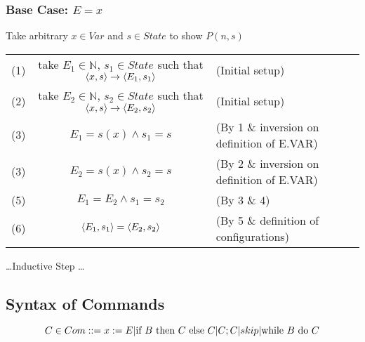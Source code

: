 \documentclass{report}
\begin{document}
\subsubsection*{Base Case: $E = x$}
Take arbitrary $x \in Var$ and $s \in State$ to show $P(n,s)$
\begin{center}
	\begin{tabular}{r c l}
		(1) & take $E_1 \in \mathbb{N}$, $s_1 \in State$ such that $\langle x, s \rangle \to \langle E_1, s_1 \rangle$ & (Initial setup)                            \\
		(2) & take $E_2 \in \mathbb{N}$, $s_2 \in State$ such that $\langle x, s \rangle \to \langle E_2, s_2 \rangle$ & (Initial setup)                            \\
		(3) & $E_1 = s(x) \land s_1 = s$                                                                 & (By 1 \& inversion on definition of E.VAR) \\
		(3) & $E_2 = s(x) \land s_2 = s$                                                                 & (By 2 \& inversion on definition of E.VAR) \\
		(5) & $E_1 = E_2 \land s_1 = s_2$                                                                & (By 3 \& 4)                                \\
		(6) & $\langle E_1, s_1 \rangle = \langle E_2, s_2 \rangle$                                                    & (By 5 \& definition of configurations)     \\
	\end{tabular}
\end{center}

\dots Inductive Step \dots

\subsection*{Syntax of Commands}
\[C \in Com ::= x := E | \text{if } B \text{ then } C \text{ else } C | C;C | skip | \text{while } B \text{ do } C\]
\begin{itemize}
\end{itemize}
\end{document}
